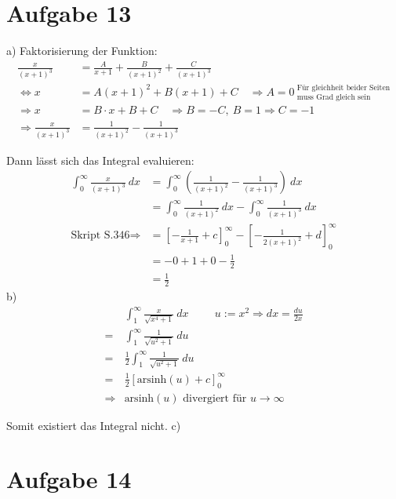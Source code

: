 \documentclass[10pt]{article}
\newcommand{\arsinh}{\text{arsinh}}
\begin{document}
\thispagestyle{fancy}
\section*{Aufgabe 13}
a)
Faktorisierung der Funktion:
\begin{align*}
	\frac{x}{(x+1)^3} &=
	\frac{A}{x+1} + \frac{B}{(x+1)^2} + \frac{C}{(x+1)^3} \\
	\Leftrightarrow
	x &= 
	A (x+1)^2 + B (x+1) + C 
	\quad \Rightarrow
	A=0 \ 
	^\text{Für gleichheit beider Seiten}
	_\text{muss Grad gleich sein} \\
	\Rightarrow x &=
	B \cdot x + B + C
	\quad \Rightarrow B = -C, \ B = 1 \Rightarrow C = -1 \\
	\Rightarrow
	\frac{x}{(x+1)^3} &=
	\frac{1}{(x+1)^2} - \frac{1}{(x+1)^3}
\end{align*}

Dann lässt sich das Integral evaluieren:
\begin{align*}
	\int_0^\infty \frac{x}{(x+1)^3} \ dx
	&= 
	\int_0^\infty \left( 
	\frac{1}{(x+1)^2} - \frac{1}{(x+1)^3}
	\right)
	\ dx \\
	&= 
	\int_0^\infty \frac{1}{(x+1)^2} \ dx -
	\int_0^\infty \frac{1}{(x+1)^3} \ dx \\
	\text{Skript S.346} \Rightarrow
	&=
	\left[ -\frac{1}{x+1} + c\right]_0^\infty
	-
	\left[ -\frac1{2 (x+1)^2} + d \right]_0^\infty \\
	&= -0 + 1 + 0 - \frac12 \\
	&= \frac12
\end{align*}
b)
\begin{align*}
	&\int_1^\infty \frac{x}{\sqrt{x^4 + 1}} \ dx 
	\hspace{1cm} u:= x^2 \Rightarrow dx = \frac{du}{2x} \\
	= &\int_1^\infty \frac{1}{\sqrt{u^2 + 1}} \ du \\
	= &\frac12 \int_1^\infty \frac{1}{\sqrt{u^2 + 1}} \ du \\
	= &\frac12 \left[\arsinh(u) + c \right]_0^\infty \\
	\Rightarrow & \arsinh(u) \text{ divergiert für } u \rightarrow
	\infty
\end{align*}

Somit existiert das Integral nicht.\newline
\vspace{0.2cm}
\newline
c)


\newpage
\setlength{\headheight}{0cm}

\section*{Aufgabe 14}
\end{document}
